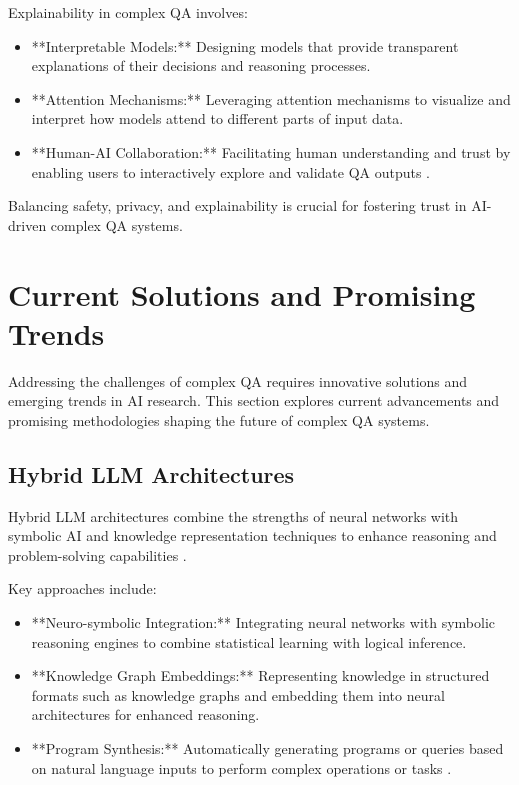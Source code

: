 \documentclass[a4paper,12pt]{article}
\begin{document}
Explainability in complex QA involves:

\begin{itemize}
    \item **Interpretable Models:** Designing models that provide transparent explanations of their decisions and reasoning processes.
    \item **Attention Mechanisms:** Leveraging attention mechanisms to visualize and interpret how models attend to different parts of input data.
    \item **Human-AI Collaboration:** Facilitating human understanding and trust by enabling users to interactively explore and validate QA outputs \cite{explainable_ai_paper}.
\end{itemize}

Balancing safety, privacy, and explainability is crucial for fostering trust in AI-driven complex QA systems.

\section{Current Solutions and Promising Trends}
\label{sec:solutions_trends}

Addressing the challenges of complex QA requires innovative solutions and emerging trends in AI research. This section explores current advancements and promising methodologies shaping the future of complex QA systems.

\subsection{Hybrid LLM Architectures}
\label{subsec:hybrid_architectures}

Hybrid LLM architectures combine the strengths of neural networks with symbolic AI and knowledge representation techniques to enhance reasoning and problem-solving capabilities \cite{hybrid_architectures_paper}.

Key approaches include:

\begin{itemize}
    \item **Neuro-symbolic Integration:** Integrating neural networks with symbolic reasoning engines to combine statistical learning with logical inference.
    \item **Knowledge Graph Embeddings:** Representing knowledge in structured formats such as knowledge graphs and embedding them into neural architectures for enhanced reasoning.
    \item **Program Synthesis:** Automatically generating programs or queries based on natural language inputs to perform complex operations or tasks \cite{hybrid_architectures_paper}.
\end{itemize}
\end{document}
